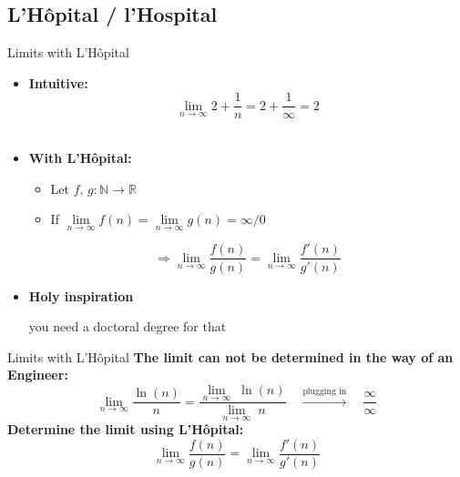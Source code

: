 \subsection{L'H\^{o}pital / l'Hospital}

\begin{frame}{Limits with L'H\^{o}pital}
  \begin{itemize}
    \item
      \textbf{Intuitive:}\\
      \begin{displaymath}
        \lim\limits_{n \rightarrow \infty} 2 + \dfrac{1}{n}
        = 2  + \dfrac{1}{\infty} = 2
      \end{displaymath}
      \vspace{0em}\\
    \item<2- |handout:1>
      \textbf{With L'H\^{o}pital:}
      \begin{itemize}
        \item
          Let $f, \, g : \mathbb{N} \rightarrow \mathbb{R}$
        \item
          If
          \begin{math}
            \lim\limits_{n \to \infty} f(n)
              = \lim\limits_{n \to \infty} g(n)
              = \infty / 0
          \end{math}
      \end{itemize}
      \begin{displaymath}
        \Rightarrow \lim\limits_{n \rightarrow \infty} \dfrac{f(n)}{g(n)}
          = \lim\limits_{n \rightarrow \infty} \dfrac{f'(n)}{g'(n)}
      \end{displaymath}
    \item<3- |handout:1>
      \textbf{Holy inspiration}
      \begin{center}
        you need a doctoral degree for that
      \end{center}
  \end{itemize}
\end{frame}


\begin{frame}{Limits with L'H\^{o}pital}
  \textbf{The limit can not be determined in the way of an Engineer:}
  \begin{displaymath}
    \lim_{n \to \infty} \dfrac{\ln (n)}{n}
      = \dfrac{\lim_{n \to \infty}\; \ln (n)}{\lim\limits_{n \to \infty}\; n}
    \hspace{1em} \stackrel{\text{plugging in}}{\longrightarrow} \hspace{1em}
      \dfrac{\infty}{\infty}
  \end{displaymath}
  \textbf{Determine the limit using L'H\^{o}pital:}
  \begin{displaymath}
    \lim\limits_{n \rightarrow \infty} \dfrac{f(n)}{g(n)}
      = \lim\limits_{n \rightarrow \infty} \dfrac{f'(n)}{g'(n)}
  \end{displaymath}
\end{frame}


